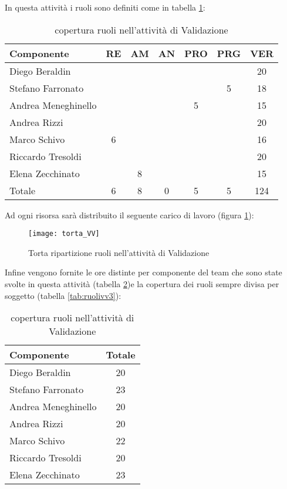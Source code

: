 In questa attività i ruoli sono definiti come in tabella \ref{tab:ruolivv}:

\begin{table}[h!]
\centering
\begin{tabular}{|l|c|c|c|c|c|c|}
\hline
Componente& RE& AM& AN& PRO& PRG& VER\\
\hline
Diego Beraldin & & & & & & 20\\
Stefano Farronato & & & & & 5& 18\\
Andrea Meneghinello & & & & 5& & 15\\
Andrea Rizzi & & & & & & 20\\
Marco Schivo & 6& & & & & 16\\
Riccardo Tresoldi & & & & & & 20\\
Elena Zecchinato & & 8& & & & 15\\
\hline
Totale & 6& 8& 0& 5& 5& 124\\
\hline
\end{tabular}
\caption{copertura ruoli nell'attività di Validazione}\label{tab:ruolivv}
\end{table}
\clearpage

Ad ogni risorsa sarà distribuito il seguente carico di lavoro (figura \ref{fig:ruolivv}):

\begin{figure}[h!]
\centering
  \texttt{[image: torta\_VV]}
\caption{Torta ripartizione ruoli nell'attività di Validazione}\label{fig:ruolivv}
\end{figure}

Infine vengono fornite le ore distinte per componente del team che sono state svolte in questa attività (tabella \ref{tab:ruolivv2})e la copertura dei ruoli sempre divisa per soggetto (tabella \ref{tab:ruolivv3}):

\begin{table}[h]
\centering
\begin{tabular}{|l|c|}
\hline
Componente& Totale \\
\hline
Diego Beraldin & 20\\
Stefano Farronato & 23\\
Andrea Meneghinello & 20\\
Andrea Rizzi & 20\\
Marco Schivo & 22\\
Riccardo Tresoldi & 20\\
Elena Zecchinato & 23\\
\hline
\end{tabular}
\caption{copertura ruoli nell'attività di Validazione}\label{tab:ruolivv2}
\end{table}

